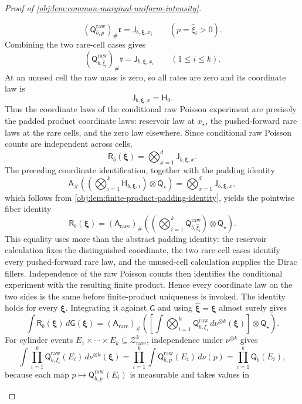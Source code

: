 \begin{proof}[Proof of \cref{obj:lem:common-marginal-uniform-intensity}]
\begin{enumerate}
\[
(\mathsf Q^{\mathrm{raw}}_{b,p})_\#\mathfrak r
=
\mathsf J_{b,\boldsymbol\xi,x_i}
\qquad(p=\widehat\xi_i>0).
\]
Combining the two rare-cell cases gives
\[
(\mathsf Q^{\mathrm{raw}}_{b,\widehat\xi_i})_\#\mathfrak r
=
\mathsf J_{b,\boldsymbol\xi,x_i}
\qquad(1\le i\le k).
\]
At an unused cell the raw mass is zero, so all rates are zero and its coordinate law is
\[
\mathsf J_{b,\boldsymbol\xi,x}=\mathsf H_0 .
\]
Thus the coordinate laws of the conditional raw Poisson experiment are precisely the padded product coordinate laws: reservoir law at \(x_\star\), the pushed-forward rare laws at the rare cells, and the zero law elsewhere. Since conditional raw Poisson counts are independent across cells,
\[
\mathsf R_b(\boldsymbol\xi)
=
\bigotimes_{x=1}^d \mathsf J_{b,\boldsymbol\xi,x}.
\]
The preceding coordinate identification, together with the padding identity 
\[
\mathsf A_\#\left(\left(\bigotimes_{i=1}^k
\mathsf H_{b,\boldsymbol\xi,i}\right)\otimes\mathsf Q_\star\right)
=
\bigotimes_{x=1}^d \mathsf J_{b,\boldsymbol\xi,x},
\]
which follows from \cref{obj:lem:finite-product-padding-identity}, yields the pointwise fiber identity
\[
\mathsf R_b(\boldsymbol\xi)
=
(\mathsf A_{\mathrm{rare}})_\#\left(\left(\bigotimes_{i=1}^k
\mathsf Q^{\mathrm{raw}}_{b,\widehat\xi_i}\right)\otimes\mathsf Q_\star\right).
\]
This equality uses more than the abstract padding identity: the reservoir calculation fixes the
distinguished coordinate, the two rare-cell cases identify every pushed-forward rare law, and the
unused-cell calculation supplies the Dirac fillers. Independence of the raw Poisson counts then
identifies the conditional experiment with the resulting finite product. Hence every coordinate
law on the two sides is the same before finite-product uniqueness is invoked.
The identity holds for every \(\boldsymbol\xi\). Integrating it against \(\mathsf G\) and using \(\widehat{\boldsymbol\xi}=\boldsymbol\xi\) almost surely gives
\[
\int \mathsf R_b(\boldsymbol\xi)\,d\mathsf G(\boldsymbol\xi)
=
(\mathsf A_{\mathrm{rare}})_\#\left(
\left[\int \bigotimes_{i=1}^k
\mathsf Q^{\mathrm{raw}}_{b,\xi_i}\,d\nu^{\otimes k}(\boldsymbol\xi)\right]
\otimes\mathsf Q_\star\right).
\]
For cylinder events \(E_1\times\cdots\times E_k\subseteq\mathcal Z_{\mathrm{rare}}^k\), independence under \(\nu^{\otimes k}\) gives
\[
\int \prod_{i=1}^k
\mathsf Q^{\mathrm{raw}}_{b,\xi_i}(E_i)\,d\nu^{\otimes k}(\boldsymbol\xi)
=
\prod_{i=1}^k \int
\mathsf Q^{\mathrm{raw}}_{b,p}(E_i)\,d\nu(p)
=
\prod_{i=1}^k \mathsf Q_b(E_i),
\]
because each map \(p\mapsto\mathsf Q^{\mathrm{raw}}_{b,p}(E_i)\) is measurable and takes values in

\end{enumerate}
\end{proof}
